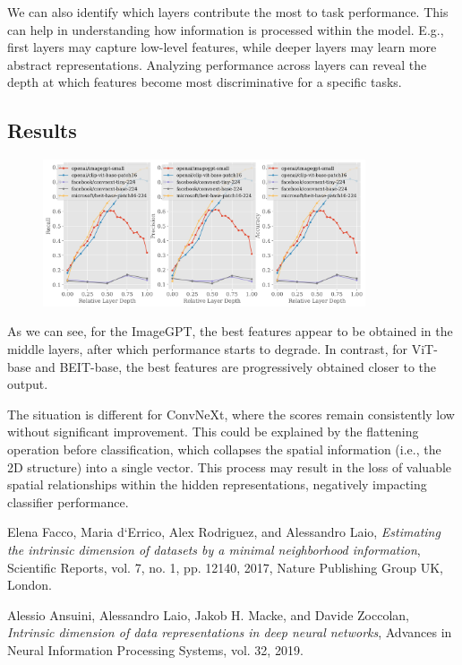 \documentclass[
  11pt,
  a4paper,
  onecolumn]{article}
\begin{document}
We can also identify which layers contribute the most to task performance. This can help in understanding how information is processed within the model. E.g., first layers may capture low-level features, while deeper layers may learn more abstract representations. Analyzing performance across layers can reveal the depth at which features become most discriminative for a specific tasks.

\subsection{Results}

\begin{figure}[h!] 
\centering
\includegraphics[width=0.85\textwidth]{figures/probing_plots.png}
\end{figure}

As we can see, for the ImageGPT, the best features appear to be obtained in the middle layers, after which performance starts to degrade. In contrast, for ViT-base and BEIT-base, the best features are progressively obtained closer to the output.  

The situation is different for ConvNeXt, where the scores remain consistently low without significant improvement. This could be explained by the flattening operation before classification, which collapses the spatial information (i.e., the 2D structure) into a single vector. This process may result in the loss of valuable spatial relationships within the hidden representations, negatively impacting classifier performance.

\vspace{50pt}
\begin{thebibliography}{9}

Elena Facco, Maria d`Errico, Alex Rodriguez, and Alessandro Laio,
\textit{Estimating the intrinsic dimension of datasets by a minimal neighborhood information},
Scientific Reports, vol. 7, no. 1, pp. 12140, 2017, Nature Publishing Group UK, London.

  Alessio Ansuini, Alessandro Laio, Jakob H. Macke, and Davide Zoccolan,
  \textit{Intrinsic dimension of data representations in deep neural networks},
  Advances in Neural Information Processing Systems, vol. 32, 2019.

\end{thebibliography}
\end{document}
